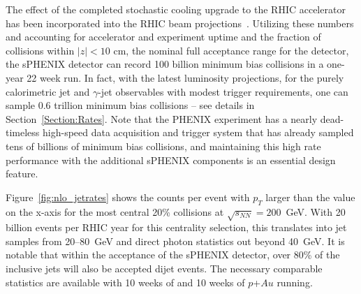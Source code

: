 The effect of the completed stochastic cooling upgrade to the RHIC
accelerator~\cite{Fischer:2010zzd} has been incorporated into the RHIC
beam projections~\cite{RHICBeam}.  Utilizing these numbers and
accounting for accelerator and experiment uptime and the fraction of
collisions within $|z| < 10$ cm, the nominal full acceptance range for
the detector, the sPHENIX detector can record 100 billion \auau
minimum bias collisions in a one-year 22 week run.  In fact, with the
latest luminosity projections, for the purely calorimetric jet and
$\gamma$-jet observables with modest trigger requirements, one can
sample 0.6 trillion \auau minimum bias collisions -- see details in
Section~\ref{Section:Rates}.  Note that the PHENIX experiment has a
nearly dead-timeless high-speed data acquisition and trigger system
that has already sampled tens of billions of \auau minimum bias
collisions, and maintaining this high rate performance with the
additional sPHENIX components is an essential design feature. 

Figure~\ref{fig:nlo_jetrates} shows the counts per event with $p_T$
larger than the value on the x-axis for the most central 20\% \auau
collisions at $\sqrt{s_{NN}} = 200$~GeV.  With 20 billion events per
RHIC year for this centrality selection, this translates into jet
samples from 20--80~GeV and direct photon statistics out beyond 40~GeV.  
It is notable that within the acceptance of the sPHENIX detector, over 80\%
of the inclusive jets will also be accepted dijet events.   The
necessary comparable statistics are available with 10 weeks of \pp and 10 weeks of $p$+$Au$ running.

